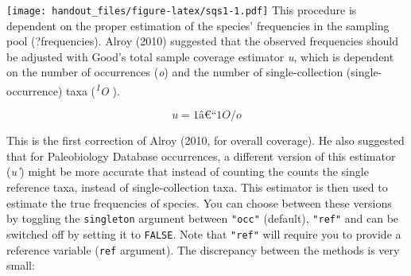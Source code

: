 \documentclass[]{article}
\begin{document}
\texttt{[image: handout\_files/figure-latex/sqs1-1.pdf]} This procedure
is dependent on the proper estimation of the species' frequencies in the
sampling pool (?frequencies). Alroy (2010) suggested that the observed
frequencies should be adjusted with Good's total sample coverage
estimator \emph{u}, which is dependent on the number of occurrences
(\emph{o}) and the number of single-collection (single-occurrence) taxa
(\emph{\textsuperscript{1}O }).

\[u = 1 â€“ {1}O/o\]

This is the first correction of Alroy (2010, for overall coverage). He
also suggested that for Paleobiology Database occurrences, a different
version of this estimator (\emph{u'}) might be more accurate that
instead of counting the counts the single reference taxa, instead of
single-collection taxa. This estimator is then used to estimate the true
frequencies of species. You can choose between these versions by
toggling the \texttt{singleton} argument between \texttt{"occ"}
(default), \texttt{"ref"} and can be switched off by setting it to
\texttt{FALSE}. Note that \texttt{"ref"} will require you to provide a
reference variable (\texttt{ref} argument). The discrepancy between the
methods is very small:
\end{document}
